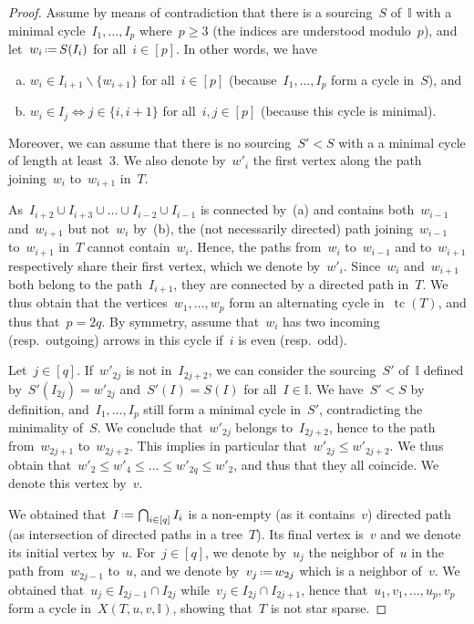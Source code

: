\documentclass{amsart}
\theoremstyle{definition}
\newcommand{\ssm}{\smallsetminus} %
\newcommand{\eqdef}{\mbox{\,\raisebox{0.2ex}{\scriptsize\ensuremath{\mathrm:}}\ensuremath{=}\,}} %
\DeclareMathOperator{\tc}{tc} %
\newcommand{\II}{\mathbb I} %
\begin{document}
\begin{proof}
Assume by means of contradiction that there is a sourcing~$S$ of~$\II$ with a minimal cycle~$I_1, \dots, I_p$ where~$p \ge 3$ (the indices are understood modulo~$p$), and let~$w_i \eqdef S(I_i)$ for all~$i \in [p]$.
In other words, we have
\begin{enumerate}[(a)]
\item $w_i \in I_{i+1} \ssm \{w_{i+1}\}$ for all~$i \in [p]$ (because~$I_1, \dots, I_p$ form a cycle in~$S$), and
\item $w_i \in I_j \iff j \in \{i,i+1\}$ for all~$i,j \in [p]$ (because this cycle is minimal).
\end{enumerate}
Moreover, we can assume that there is no sourcing~$S' < S$ with a a minimal cycle of length at least~$3$.
We also denote by~$w'_i$ the first vertex along the path joining~$w_i$ to~$w_{i+1}$ in~$T$.

As~$I_{i+2} \cup I_{i+3} \cup \dots \cup I_{i-2} \cup I_{i-1}$ is connected by~(a) and contains both~$w_{i-1}$ and~$w_{i+1}$ but not~$w_i$ by~(b), the (not necessarily directed) path joining~$w_{i-1}$ to~$w_{i+1}$ in~$T$ cannot contain~$w_i$.
Hence, the paths from~$w_i$ to~$w_{i-1}$ and to~$w_{i+1}$ respectively share their first vertex, which we denote by~$w'_i$.
Since~$w_i$ and~$w_{i+1}$ both belong to the path~$I_{i+1}$, they are connected by a directed path in~$T$.
We thus obtain that the vertices~$w_1, \dots, w_p$ form an alternating cycle in~$\tc(T)$, and thus that~$p = 2q$.
By symmetry, assume that~$w_i$ has two incoming (resp.~outgoing) arrows in this cycle if~$i$ is even (resp.~odd).

Let~$j \in [q]$.
If~$w'_{2j}$ is not in~$I_{2j+2}$, we can consider the sourcing~$S'$ of~$\II$ defined by~$S'(I_{2j}) = w'_{2j}$ and~$S'(I) = S(I)$ for all~$I \in \II$.
We have~$S' < S$ by definition, and~$I_1, \dots, I_p$ still form a minimal cycle in~$S'$, contradicting the minimality of~$S$.
We conclude that~$w'_{2j}$ belongs to~$I_{2j+2}$, hence to the path from~$w_{2j+1}$ to~$w_{2j+2}$.
This implies in particular that~$w'_{2j} \le w'_{2j+2}$.
We thus obtain that~$w'_2 \le w'_4 \le \dots \le w'_{2q} \le w'_2$, and thus that they all coincide.
We denote this vertex by~$v$.

We obtained that~$I \eqdef \bigcap_{i \in [q]} I_i$ is a non-empty (as it contains~$v$) directed path (as intersection of directed paths in a tree~$T$).
Its final vertex is~$v$ and we denote its initial vertex by~$u$.
For~$j \in [q]$, we denote by~$u_j$ the neighbor of~$u$ in the path from~$w_{2j-1}$ to~$u$, and we denote by~$v_j \eqdef w_{2j}$ which is a neighbor of~$v$.
We obtained that~$u_j \in I_{2j-1} \cap I_{2j}$ while~$v_j \in I_{2j} \cap I_{2j+1}$, hence that~$u_1, v_1, \dots, u_p, v_p$ form a cycle in~$X(T, u, v, \II)$, showing that~$T$ is not star sparse.
\end{proof}
\end{document}
